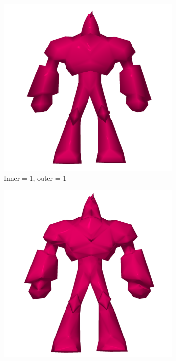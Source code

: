 \documentclass[a4paper,10pt]{article}
\begin{document}
\begin{figure}
	\centering
	\begin{subfigure}{\textwidth}
		\centering
		\includegraphics[width=\textwidth, height=0.26\textheight, keepaspectratio=true]{enforcer_phong_phong.png}
		\caption{Inner = 1, outer = 1}
		\label{fig:phong:i1o1}
	\end{subfigure}	
	\begin{subfigure}{\textwidth}
		\centering
		\includegraphics[width=\textwidth, height=0.26\textheight, keepaspectratio=true]{enforcer_phong_phong_pn_i5_o5.png}

\end{subfigure}
\end{figure}
\end{document}
